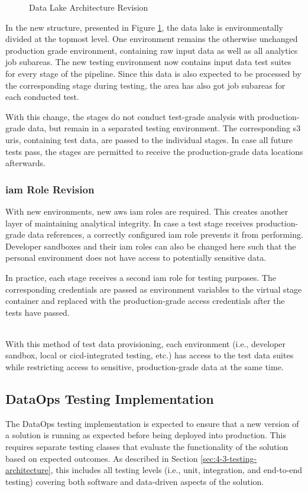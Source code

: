 \begin{figure}[h!]
	\centering
	\caption{Data Lake Architecture Revision}
	\label{fig:5-new-data-lake}
\end{figure}

In the new structure, presented in Figure \ref{fig:5-new-data-lake}, the data lake is environmentally divided at the topmost level. One environment remains the otherwise unchanged production grade environment, containing raw input data as well as all analytics job subareas. The new testing environment now contains input data test suites for every stage of the pipeline. Since this data is also expected to be processed by the corresponding stage during testing, the area has also got job subareas for each conducted test.

With this change, the stages do not conduct test-grade analysis with production-grade data, but remain in a separated testing environment. The corresponding \ac{s3} \acp{uri}, containing test data, are passed to the individual stages. In case all future tests pass, the stages are permitted to receive the production-grade data locations afterwards.

\subsubsection{\acs{iam} Role Revision}
With new environments, new \ac{aws} \ac{iam} roles are required. This creates another layer of maintaining analytical integrity. In case a test stage receives production-grade data references, a correctly configured \ac{iam} role prevents it from performing. Developer sandboxes and their \ac{iam} roles can also be changed here such that the personal environment does not have access to potentially sensitive data.

In practice, each stage receives a second \ac{iam} role for testing purposes. The corresponding credentials are passed as environment variables to the virtual stage container and replaced with the production-grade access credentials after the tests have passed. \\\

With this method of test data provisioning, each environment (i.e., developer sandbox, local or \ac{cicd}-integrated testing, etc.) has access to the test data suites while restricting access to sensitive, production-grade data at the same time.

\subsection{DataOps Testing Implementation}
The DataOps testing implementation is expected to ensure that a new version of a solution is running as expected before being deployed into production. This requires separate testing classes that evaluate the functionality of the solution based on expected outcomes. As described in Section \ref{sec:4-3-testing-architecture}, this includes all testing levels (i.e., unit, integration, and end-to-end testing) covering both software and data-driven aspects of the solution. 

